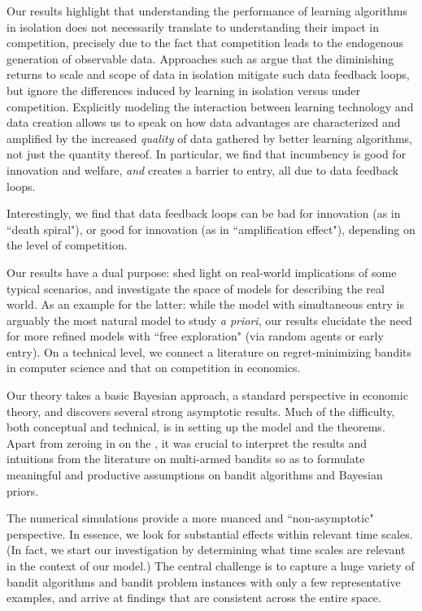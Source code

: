 Our results highlight that understanding the performance of learning algorithms in isolation does not necessarily translate to understanding their impact in competition, precisely due to the fact that competition leads to the endogenous generation of observable data. Approaches such as \citet{lambrecht2015can, bajari2018impact, varian2018artificial} argue that the diminishing returns to scale and scope of data in isolation mitigate such data feedback loops,
but ignore the differences induced by learning in isolation versus under competition. Explicitly modeling the interaction between learning technology and data creation allows us to speak on how data advantages are characterized and amplified by the increased \emph{quality} of data gathered by better learning algorithms, not just the quantity thereof. In particular, we find that incumbency is good for innovation and welfare, \emph{and} %
creates a barrier to entry,
all %
due to data feedback loops.

Interestingly, we find that data feedback loops can be bad for innovation (as in ``death spiral"), or good for innovation (as in ``amplification effect"), depending on the level of competition.

Our results have a dual purpose: shed light on real-world implications of some typical scenarios, and investigate the space of models for describing the real world. As an example for the latter: while the \HardMax model with simultaneous entry is arguably the most natural model to study \emph{a priori}, our results elucidate the need for more refined models with ``free exploration" (\eg via random agents or early entry). On a technical level, we connect a literature on regret-minimizing bandits in computer science and that on competition in economics.

Our theory takes a basic Bayesian approach, a standard perspective in economic theory, and discovers several strong asymptotic results. Much of the difficulty, both conceptual and technical, is in setting up the model and the theorems. Apart from zeroing in on the \TheoryModel, it was crucial to interpret the results and intuitions from the literature on multi-armed bandits so as to formulate meaningful and productive assumptions on bandit algorithms and Bayesian priors.

The numerical simulations provide a more nuanced and ``non-asymptotic" perspective. In essence, we look for substantial effects within relevant time scales. (In fact, we start our investigation by determining what time scales are relevant in the context of our model.) The central challenge is to capture a huge variety of bandit algorithms and bandit problem instances with only a few representative examples, and arrive at findings that are consistent across the entire space.

